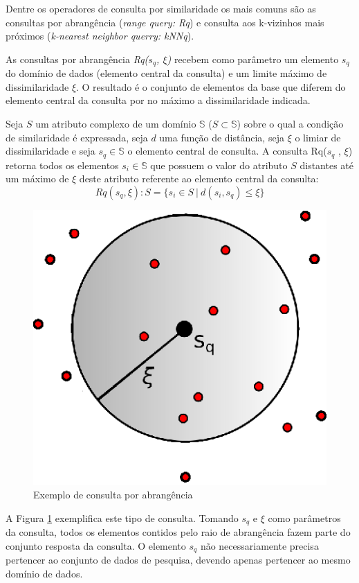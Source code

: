 Dentre os operadores de consulta por similaridade os mais comuns são as consultas por abrangência (\textit{range query: Rq}) e consulta aos k-vizinhos mais próximos (\textit{k-nearest neighbor querry: kNNq}).\par 

As consultas por abrangência \textit{Rq($s_q$, $\xi$)} recebem como parâmetro um elemento $s_q$ do domínio de dados (elemento central da consulta) e um limite máximo de dissimilaridade $\xi$. O resultado é o conjunto de 
elementos da base que diferem do elemento central da consulta por no máximo a dissimilaridade indicada.\par
\begin{mydef}
 \label{def:def_rq}
  Seja $S$ um atributo complexo de um domínio $\mathbb{S}$ ($S \subset \mathbb{S}$) sobre o qual a condição de similaridade é expressada, seja $d$ uma
  função de distância, seja $\xi$ o limiar de dissimilaridade e seja $s_q \in \mathbb{S}$ o elemento central de consulta. 
  A consulta Rq($s_q$ , $\xi$) retorna todos os elementos $s_i \in \mathbb{S}$ que possuem o valor do atributo $S$ distantes
  até um máximo de $\xi$ deste atributo referente ao elemento central da consulta: 
  \begin{equation} \label{eq:knnq}   
    Rq(s_q, \xi): S = \{s_i \in S \ |\ d(s_i, s_q) \leq \xi\}
  \end{equation}
\end{mydef}

\begin{figure}[H]
\centering
\includegraphics[width=.4\textwidth]{dados/figuras/rqu.eps}
\caption{Exemplo de consulta por abrangência}
\label{fig:exemplorq}
\end{figure}

A Figura \ref{fig:exemplorq} exemplifica este tipo de consulta. Tomando $s_q$ e $\xi$ como parâmetros da consulta, todos os
elementos contidos pelo raio de abrangência fazem parte do conjunto resposta da consulta. O elemento $s_q$ não necessariamente precisa
pertencer ao conjunto de dados de pesquisa, devendo apenas pertencer ao mesmo domínio de dados.


